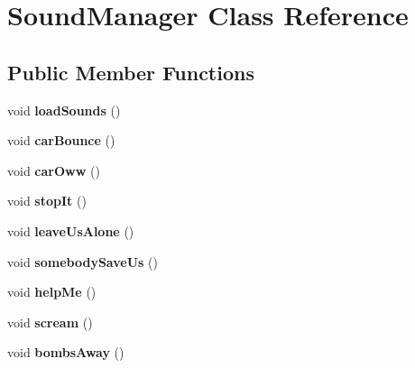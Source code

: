 \hypertarget{class_sound_manager}{}\section{Sound\+Manager Class Reference}
\label{class_sound_manager}
\subsection*{Public Member Functions}
\begin{DoxyCompactItemize}
\item 
void {\bfseries load\+Sounds} ()\hypertarget{class_sound_manager_ae85a5f483183a4366bdfeaba68b82408}{}\label{class_sound_manager_ae85a5f483183a4366bdfeaba68b82408}

\item 
void {\bfseries car\+Bounce} ()\hypertarget{class_sound_manager_a57d4b19a8ef4c0ebd2dc556833f08ae6}{}\label{class_sound_manager_a57d4b19a8ef4c0ebd2dc556833f08ae6}

\item 
void {\bfseries car\+Oww} ()\hypertarget{class_sound_manager_a2fce6bff4cd7a9e2498f8d715d9d4554}{}\label{class_sound_manager_a2fce6bff4cd7a9e2498f8d715d9d4554}

\item 
void {\bfseries stop\+It} ()\hypertarget{class_sound_manager_a3b54f95b2e0d92172100da5d004c8fab}{}\label{class_sound_manager_a3b54f95b2e0d92172100da5d004c8fab}

\item 
void {\bfseries leave\+Us\+Alone} ()\hypertarget{class_sound_manager_a115fb59853497310d66465a37d16db92}{}\label{class_sound_manager_a115fb59853497310d66465a37d16db92}

\item 
void {\bfseries somebody\+Save\+Us} ()\hypertarget{class_sound_manager_a304137bb4bd66600e15ecc6f51b03a0f}{}\label{class_sound_manager_a304137bb4bd66600e15ecc6f51b03a0f}

\item 
void {\bfseries help\+Me} ()\hypertarget{class_sound_manager_a9757e964ea7404629b4ea7b4d7100c27}{}\label{class_sound_manager_a9757e964ea7404629b4ea7b4d7100c27}

\item 
void {\bfseries scream} ()\hypertarget{class_sound_manager_a08cfadcb07eca3b73e99a519ad565f1f}{}\label{class_sound_manager_a08cfadcb07eca3b73e99a519ad565f1f}

\item 
void {\bfseries bombs\+Away} ()\hypertarget{class_sound_manager_a97646ec81b31b5a04b9e43cf3f201bbd}{}\label{class_sound_manager_a97646ec81b31b5a04b9e43cf3f201bbd}


\end{DoxyCompactItemize}
